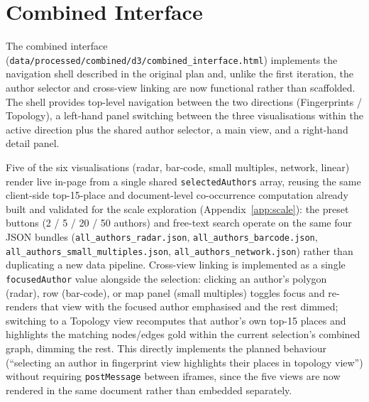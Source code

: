 \documentclass[logo,msc]{infthesis}
\begin{document}
\section{Combined Interface}
\label{sec:combined-interface}

The combined interface (\texttt{data/processed/combined/d3/combined\_interface.html}) implements the navigation shell described in the original plan and, unlike the first iteration, the author selector and cross-view linking are now functional rather than scaffolded. The shell provides top-level navigation between the two directions (Fingerprints / Topology), a left-hand panel switching between the three visualisations within the active direction plus the shared author selector, a main view, and a right-hand detail panel.

Five of the six visualisations (radar, bar-code, small multiples, network, linear) render live in-page from a single shared \texttt{selectedAuthors} array, reusing the same client-side top-15-place and document-level co-occurrence computation already built and validated for the scale exploration (Appendix~\ref{app:scale}): the preset buttons (2 / 5 / 20 / 50 authors) and free-text search operate on the same four JSON bundles (\texttt{all\_authors\_radar.json}, \texttt{all\_authors\_barcode.json}, \texttt{all\_authors\_small\_multiples.json}, \texttt{all\_authors\_network.json}) rather than duplicating a new data pipeline. Cross-view linking is implemented as a single \texttt{focusedAuthor} value alongside the selection: clicking an author's polygon (radar), row (bar-code), or map panel (small multiples) toggles focus and re-renders that view with the focused author emphasised and the rest dimmed; switching to a Topology view recomputes that author's own top-15 places and highlights the matching nodes/edges gold within the current selection's combined graph, dimming the rest. This directly implements the planned behaviour (``selecting an author in fingerprint view highlights their places in topology view'') without requiring \texttt{postMessage} between iframes, since the five views are now rendered in the same document rather than embedded separately.
\end{document}
